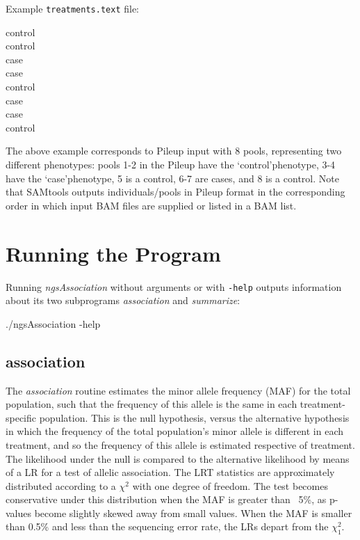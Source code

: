 \documentclass[12pt]{article}
\newenvironment{codeblock}{ \begin{framed}\ttfamily}{ \end{framed} }
\begin{document}
Example \texttt{treatments.text} file:
\vspace{-0.4cm}
\begin{codeblock}
control\\
control\\
case\\
case\\
control\\
case\\
case\\
control
\end{codeblock}
The above example corresponds to Pileup input with 8 pools, representing two different phenotypes: pools 1-2 in the Pileup have the \lq control\rq\hspace{5pt}phenotype, 3-4 have the \lq case\rq\hspace{5pt}phenotype, 5 is a control, 6-7 are cases, and 8 is a control. Note that SAMtools outputs individuals/pools in Pileup format in the corresponding order in which input BAM files are supplied or listed in a BAM list.

\section{Running the Program}
Running \textit{ngsAssociation} without arguments or with \texttt{-help} outputs information about its two subprograms \textit{association} and \textit{summarize}:
\begin{codeblock}
./ngsAssociation -help
\end{codeblock}

\subsection{association}
The \textit{association} routine estimates the minor allele frequency (MAF) for the total population, such that the frequency of this allele is the same in each treatment-specific population. This is the null hypothesis, versus the alternative hypothesis in which the frequency of the total population's minor allele is different in each treatment, and so the frequency of this allele is estimated respective of treatment. The likelihood under the null is compared to the alternative likelihood by means of a LR for a test of allelic association. The LRT statistics are approximately distributed according to a $\chi^{2}$ with one degree of freedom. The test becomes conservative under this distribution when the MAF is greater than ~5\%, as p-values become slightly skewed away from small values. When the MAF is smaller than 0.5\% and less than the sequencing error rate, the LRs depart from the $\chi^{2}_{1}$.
\end{document}
